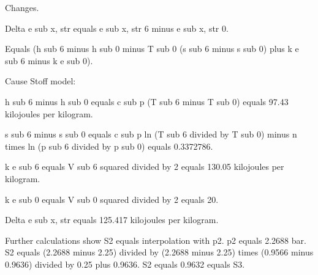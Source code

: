 Changes.

Delta e sub x, str equals e sub x, str 6 minus e sub x, str 0.

Equals (h sub 6 minus h sub 0 minus T sub 0 (s sub 6 minus s sub 0) plus k e sub 6 minus k e sub 0).

Cause Stoff model:

h sub 6 minus h sub 0 equals c sub p (T sub 6 minus T sub 0) equals 97.43 kilojoules per kilogram.

s sub 6 minus s sub 0 equals c sub p ln (T sub 6 divided by T sub 0) minus n times ln (p sub 6 divided by p sub 0) equals 0.3372786.

k e sub 6 equals V sub 6 squared divided by 2 equals 130.05 kilojoules per kilogram.

k e sub 0 equals V sub 0 squared divided by 2 equals 20.

Delta e sub x, str equals 125.417 kilojoules per kilogram.

Further calculations show S2 equals interpolation with p2. p2 equals 2.2688 bar. S2 equals (2.2688 minus 2.25) divided by (2.2688 minus 2.25) times (0.9566 minus 0.9636) divided by 0.25 plus 0.9636. S2 equals 0.9632 equals S3.